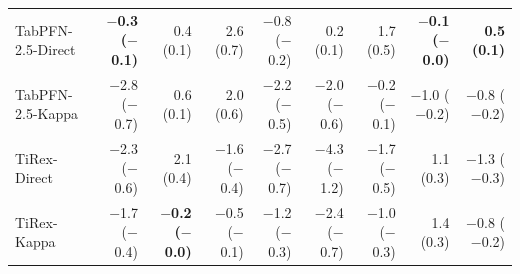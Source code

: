 \documentclass[number, 3p, 10pt, times]{elsarticle}
\begin{document}
\begin{table}[!ht]
\begin{tabular}{lrrrrrrrr}
TabPFN-2.5-Direct & \textbf{$-$0.3 ($-$0.1)} & 0.4 (0.1) & 2.6 (0.7) & $-$0.8 ($-$0.2) & 0.2 (0.1) & 1.7 (0.5) & \textbf{$-$0.1 ($-$0.0)} & \textbf{0.5 (0.1)} \\
TabPFN-2.5-Kappa & $-$2.8 ($-$0.7) & 0.6 (0.1) & 2.0 (0.6) & $-$2.2 ($-$0.5) & $-$2.0 ($-$0.6) & $-$0.2 ($-$0.1) & $-$1.0 ($-$0.2) & $-$0.8 ($-$0.2) \\
TiRex-Direct & $-$2.3 ($-$0.6) & 2.1 (0.4) & $-$1.6 ($-$0.4) & $-$2.7 ($-$0.7) & $-$4.3 ($-$1.2) & $-$1.7 ($-$0.5) & 1.1 (0.3) & $-$1.3 ($-$0.3) \\
TiRex-Kappa & $-$1.7 ($-$0.4) & \textbf{$-$0.2 ($-$0.0)} & $-$0.5 ($-$0.1) & $-$1.2 ($-$0.3) & $-$2.4 ($-$0.7) & $-$1.0 ($-$0.3) & 1.4 (0.3) & $-$0.8 ($-$0.2) \\
\bottomrule
\end{tabular}
\end{table}
\end{document}
